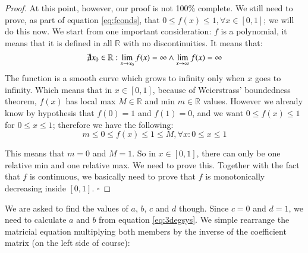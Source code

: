 \begin{proposition}
\begin{proof}
At this point, however, our proof is not 100\% complete. We still need to prove,
as part of equation \ref{eq:fconds}, that 
$0 \leq f(x) \leq 1, \forall x \in [0,1]$; we will do this now. We start from one
important consideration: $f$ is a polynomial, it means that it is defined in all
$\mathbb{R}$ with no discontinuities. It means that:
\begin{equation*}
\not\exists x_0 \in \mathbb{R} : \lim_{x \to x_0} f(x) = \infty \wedge
\lim_{x \to \infty} f(x) = \infty
\end{equation*}
The function is a smooth curve which grows to infinity only when $x$ goes to
infinity. Which means that in $x \in [0,1]$, because of Weierstrass'
boundedness theorem, $f(x)$ has local max $M \in \mathbb{R}$ 
and min $m \in \mathbb{R}$ values. However we already know by hypothesis that
$f(0) = 1$ and $f(1) = 0$, and we want $0 \leq f(x) \leq 1$ for $0 \leq x \leq 1$;
therefore we have the following:
\begin{equation*}
m \leq 0 \leq f(x) \leq 1 \leq M, \forall x : 0 \leq x \leq 1
\end{equation*}
%

%
This means that $m=0$ and $M = 1$. So in $x\in[0,1]$, there can only be one
relative min and one relative max. We need to prove this. Together
with the fact that $f$ is continuous, we basically need to prove that $f$ is
monotonically decreasing inside $[0,1]$.
$\square$
\end{proof}
\end{proposition}
We are asked to find the values of $a$, $b$, $c$ and $d$ though. Since $c=0$ and
$d=1$, we need to calculate $a$ and $b$ from equation \ref{eq:3degsys}.
We simple rearrange the matricial equation multiplying both members by the
inverse of the coefficient matrix (on the left side of course):
